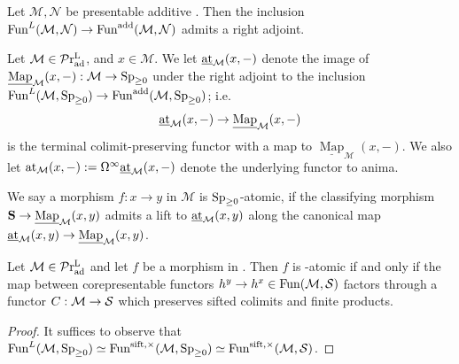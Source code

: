 \documentclass[a4paper,10pt, oneside]{amsart}
\begin{document}
\begin{prop}
	Let $\mathcal{M}, \mathcal{N}$ be  presentable additive \infcats. Then the inclusion $\operatorname{Fun}^L(\mathcal{M}, \mathcal{N}) \rightarrow \operatorname{Fun}^{\mathrm{add}}(\mathcal{M}, \mathcal{N})$ admits a right adjoint.
\end{prop}
\begin{de}
	Let $\mathcal{M}\in\mathcal{P}\mathrm{r}_{\mathrm{ad}}^\mathrm{L}$, and $x \in \mathcal{M}$. We let  $\underline{\mathrm{at}}_{\mathcal{M}}(x,-)$ denote the image of $\underline{\operatorname{Map}}_{\mathcal{M}}(x,-): \mathcal{M} \rightarrow \operatorname{Sp}_{\geq0}$ under the right adjoint to the inclusion $\operatorname{Fun}^L(\mathcal{M}, \operatorname{Sp}_{\geq0}) \rightarrow \operatorname{Fun}^{\mathrm{add}}(\mathcal{M}, \operatorname{Sp}_{\geq0})$; i.e. $$\underline{\mathrm{at}}_{\mathcal{M}}(x,-) \rightarrow \underline{\operatorname{Map}}_{\mathcal{M}}(x,-)$$ is the terminal colimit-preserving functor with a map to $\underline{\operatorname{Map}}_{\mathcal{M}}(x,-)$. We also let  $\mathrm{at}_{\mathcal{M}}(x,-):= \Omega^\infty\underline{\mathrm{at}}_{\mathcal{M}}(x,-)$ denote the underlying functor to anima.
	
	We say a morphism $f: x \rightarrow y$ in $\mathcal{M}$ is $\operatorname{Sp}_{\geq0}$-atomic, if the classifying morphism $\mathbf{S} \rightarrow \underline{\operatorname{Map}}_{\mathcal{M}}(x, y)$ admits a lift to  $\underline{\operatorname{at}}_{\mathcal{M}}(x, y)$ along the canonical map  $\underline{\operatorname{at}}_{\mathcal{M}}(x, y) \rightarrow \underline{\operatorname{Map}}_{\mathcal{M}}(x, y)$.
	
\end{de}
\begin{prop}
	Let $\mathcal{M}\in\mathcal{P}\mathrm{r}_{\mathrm{ad}}^\mathrm{L}$ and let $f$ be a morphism in \mcm. Then $f$ is \spgeq-atomic if and only if the  map between corepresentable functors $h^y\to h^x \in \operatorname{Fun}(\mathcal{M},\mathcal{S})$ factors through a functor $C:\mathcal{M}\to\mathcal{S}$ which preserves sifted colimits and finite products. 
\end{prop}
\begin{proof}
	It suffices to observe that $\operatorname{Fun}^L(\mathcal{M},\operatorname{Sp}_{\geq0})\simeq\operatorname{Fun}^{\mathrm{sift,\times}}(\mathcal{M},\operatorname{Sp}_{\geq0})\simeq\operatorname{Fun}^{\mathrm{sift,\times}}(\mathcal{M},\mathcal{S})$.
\end{proof}
\end{document}

